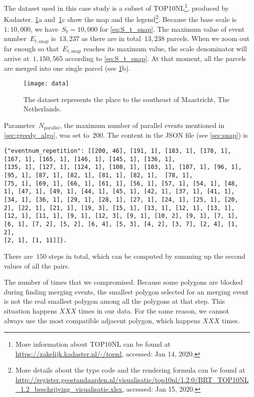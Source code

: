 \documentclass[ijgi,article,submit,moreauthors,pdftex]{Definitions/mdpi}
\begin{document}
The dataset used in this case study is a subset of TOP10NL\footnote{%
More information about TOP10NL can be found at
\url{https://zakelijk.kadaster.nl/-/topnl},
accessed: Jan 14, 2020.},
produced by Kadaster.
%
\figs\ref{fig:data}a and~\ref{fig:data}c show the map and the legend\footnote{%
More details about the type code and the rendering formula can be found at
\url{http://register.geostandaarden.nl/visualisatie/top10nl/1.2.0/BRT_TOP10NL_1.2_beschrijving_visualisatie.xlsx},
accessed: Jan 15, 2020.}.
%
Because the base scale is $1:10{,}000$, 
we have~$S_b = 10{,}000$ for \eq\ref{eq:S_t_snap}.
The maximum value of event number~$E_{t,\mathrm{snap}}$ is~$13{,}237$
as there are in total~$13{,}238$ parcels.
When we zoom out far enough 
so that~$E_{t,\mathrm{snap}}$ reaches its maximum value,
the scale denominator will arrive at~$1{,}150{,}565$
according to \eq\ref{eq:S_t_snap}.
At that moment, all the parcels are merged into one single parcel
(see \figs\ref{fig:data}b).


\begin{figure}[tb]
\centering
\texttt{[image: data]}
\caption{The dataset represents the place 
    to the southeast of Maastricht, The Netherlands.}
\label{fig:data}
\end{figure}


Parameter~$N_\mathrm{parallel}$, 
the maximum number of parallel events mentioned in \sect\ref{sec:greedy_algo},
was set to~$200$.
The content in the JSON file (see \sect\ref{sec:snap}) is 
\makeatletter
\def\verbatim@font{\normalfont\rmfamily}
\makeatother
\begin{verbatim}
{"eventnum_repetition": [[200, 46], [191, 1], [183, 1], [178, 1], [167, 1], [165, 1], [146, 1], [145, 1], [136, 1], 
[135, 1], [127, 1], [124, 1], [108, 1], [103, 1], [107, 1], [96, 1], [95, 1], [87, 1], [82, 1], [81, 1], [82, 1],  [78, 1], 
[75, 1], [69, 1], [66, 1], [61, 1], [56, 1], [57, 1], [54, 1], [48, 1], [47, 1], [49, 1], [44, 1], [45, 1], [42, 1], [37, 1], [41, 1], 
[34, 1], [36, 1], [29, 1], [28, 1], [27, 1], [24, 1], [25, 1], [20, 2], [22, 1], [21, 1], [19, 3], [15, 1], [13, 1], [12, 1], [13, 1], 
[12, 1], [11, 1], [9, 1], [12, 3], [9, 1], [10, 2], [9, 1], [7, 1], [6, 1], [7, 2], [5, 2], [6, 4], [5, 3], [4, 2], [3, 7], [2, 4], [1, 2], 
[2, 1], [1, 11]]}.
\end{verbatim}
There are~$150$ steps in total, 
which can be computed by summing up the second values of all the pairs.



The number of times that we compromised.
Because some polygons are blocked during finding merging events, 
the smallest polygon selected for an merging event 
is not the real smallest polygon 
among all the polygons at that step. 
This situation happens $XXX$ times in our data.
For the same reason, 
we cannot always use the most compatible adjacent polygon,
which happens $XXX$ times.
\end{document}

